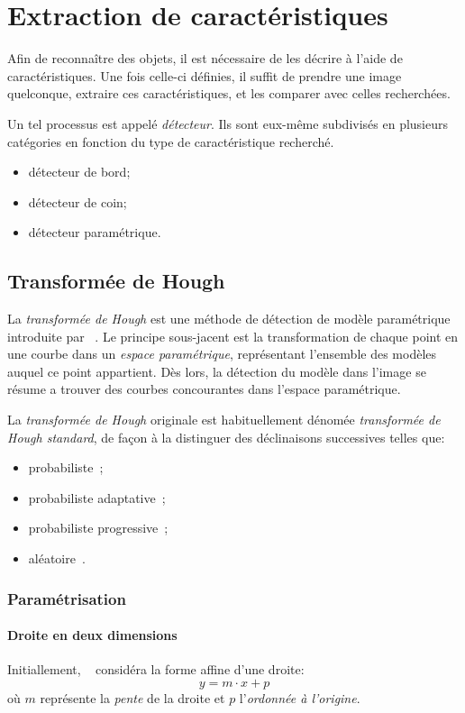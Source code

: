 \section{Extraction de caractéristiques}

Afin de reconnaître des objets, il est nécessaire de les décrire à l'aide de caractéristiques. Une fois celle-ci définies, il suffit de prendre une image quelconque, extraire ces caractéristiques, et les comparer avec celles recherchées.

Un tel processus est appelé \emph{détecteur}. Ils sont eux-même subdivisés en plusieurs catégories en fonction du type de caractéristique recherché.
\begin{itemize}
  \item détecteur de bord;
  \item détecteur de coin;
  \item détecteur paramétrique.
\end{itemize}

\subsection{Transformée de Hough}
La \emph{transformée de Hough} est une méthode de détection de modèle paramétrique introduite par \citeauthor{Hough1962}~\cite{Hough1962}. Le principe sous-jacent est la transformation de chaque point en une courbe dans un \emph{espace paramétrique}, représentant l'ensemble des modèles auquel ce point appartient. Dès lors, la détection du modèle dans l'image se résume a trouver des courbes concourantes dans l'espace paramétrique.

La \emph{transformée de Hough} originale est habituellement dénomée \emph{transformée de Hough standard}, de façon à la distinguer des déclinaisons successives telles que:
\begin{itemize}
  \item probabiliste~\cite{Kiryati1991};
  \item probabiliste adaptative~\cite{Yla-Jaaski1994};
  \item probabiliste progressive~\cite{Matas1998};
  \item aléatoire~\cite{Xu1990}.
\end{itemize}

\subsubsection{Paramétrisation}
\paragraph{Droite en deux dimensions}
Initiallement, \citeauthor{Hough1962}~\cite{Hough1962} considéra la forme affine d'une droite:
$$y = m \cdot x + p$$
où $m$ représente la \emph{pente} de la droite et $p$ l'\emph{ordonnée à l'origine}.

